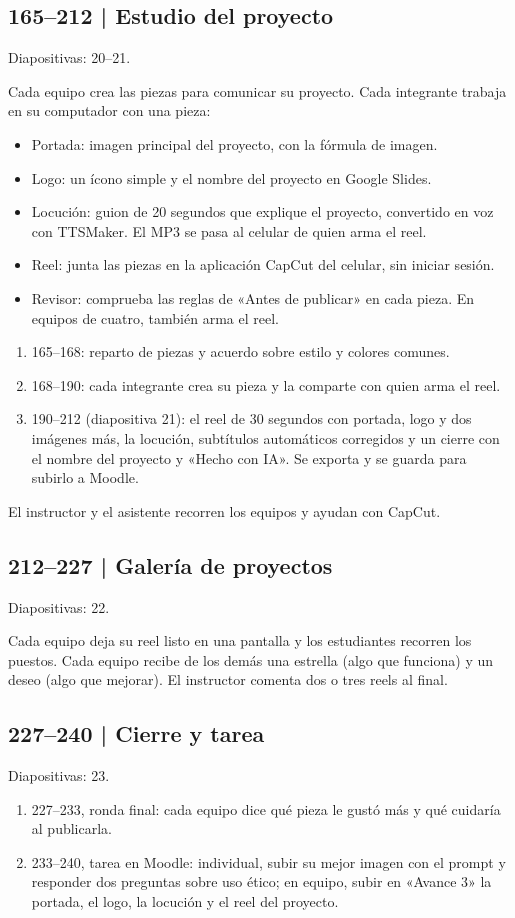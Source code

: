 \documentclass[11pt,a4paper]{article}
\newcommand{\diapos}[1]{\textcolor{gris}{\small\textsf{Diapositivas: #1}}\par}
\begin{document}
\subsection{165--212 | Estudio del proyecto}
\diapos{20--21.}
Cada equipo crea las piezas para comunicar su proyecto. Cada integrante trabaja en su computador con una pieza:
\begin{itemize}
\item Portada: imagen principal del proyecto, con la fórmula de imagen.
\item Logo: un ícono simple y el nombre del proyecto en Google Slides.
\item Locución: guion de 20 segundos que explique el proyecto, convertido en voz con TTSMaker. El MP3 se pasa al celular de quien arma el reel.
\item Reel: junta las piezas en la aplicación CapCut del celular, sin iniciar sesión.
\item Revisor: comprueba las reglas de «Antes de publicar» en cada pieza. En equipos de cuatro, también arma el reel.
\end{itemize}
\begin{enumerate}
\item 165--168: reparto de piezas y acuerdo sobre estilo y colores comunes.
\item 168--190: cada integrante crea su pieza y la comparte con quien arma el reel.
\item 190--212 (diapositiva 21): el reel de 30 segundos con portada, logo y dos imágenes más, la locución, subtítulos automáticos corregidos y un cierre con el nombre del proyecto y «Hecho con IA». Se exporta y se guarda para subirlo a Moodle.
\end{enumerate}
El instructor y el asistente recorren los equipos y ayudan con CapCut.

\subsection{212--227 | Galería de proyectos}
\diapos{22.}
Cada equipo deja su reel listo en una pantalla y los estudiantes recorren los puestos. Cada equipo recibe de los demás una estrella (algo que funciona) y un deseo (algo que mejorar). El instructor comenta dos o tres reels al final.

\subsection{227--240 | Cierre y tarea}
\diapos{23.}
\begin{enumerate}
\item 227--233, ronda final: cada equipo dice qué pieza le gustó más y qué cuidaría al publicarla.
\item 233--240, tarea en Moodle: individual, subir su mejor imagen con el prompt y responder dos preguntas sobre uso ético; en equipo, subir en «Avance 3» la portada, el logo, la locución y el reel del proyecto.
\end{enumerate}
\end{document}
